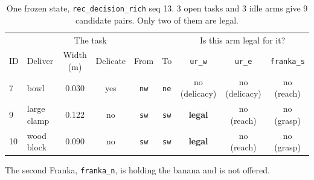 \begin{table}[H]
  \centering
  \begin{threeparttable}
    \caption{One frozen state, \texttt{rec\_decision\_rich} seq \num{13}. 3
      open tasks and 3 idle arms give 9 candidate pairs. Only two of them are legal.}
    \label{tab:ex1:worked}
    \footnotesize
    \setlength{\tabcolsep}{4pt}
    \begin{tabular}{llccccccc}
      \toprule
      \multicolumn{6}{c}{The task} & \multicolumn{3}{c}{Is this arm legal for it?} \\
      \cmidrule(lr){1-6}\cmidrule(lr){7-9}
      ID & Deliver & Width (\si{\metre}) & Delicate & From & To
        & \texttt{ur\_w} & \texttt{ur\_e} & \texttt{franka\_s} \\
      \midrule
      7 & bowl & 0.030 & yes & \texttt{nw} & \texttt{ne} & no (delicacy) & no (delicacy) & no (reach) \\
      9 & large clamp & 0.122 & no & \texttt{sw} & \texttt{sw} & \textbf{legal} & no (reach) & no (grasp) \\
      10 & wood block & 0.090 & no & \texttt{sw} & \texttt{sw} & \textbf{legal} & no (reach) & no (grasp) \\
      \bottomrule
    \end{tabular}
    \begin{tablenotes}[flushleft]\footnotesize
      \item The second
        Franka, \texttt{franka\_n}, is holding the banana and is not offered.
    \end{tablenotes}
  \end{threeparttable}
\end{table}
